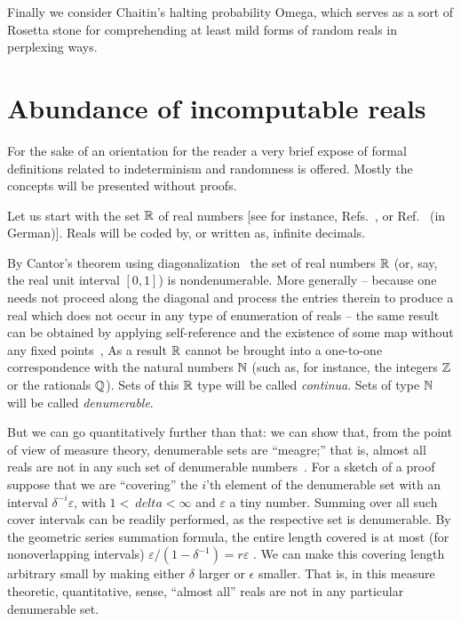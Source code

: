 Finally we consider Chaitin's halting probability Omega,
which serves as a sort of Rosetta stone for comprehending at least mild forms of random reals in perplexing ways.

\section{Abundance of incomputable reals}

For the sake of an orientation for the reader a very brief expose of formal definitions related to indeterminism and randomness is offered.
Mostly the concepts will be presented without proofs.

Let us start with the set ${\Bbb R}$ of real numbers [see for instance, Refs.~\cite{drobot,Stillwell-2013,ehrlich-1994}, or Ref.~\cite{Hlawka-zz} (in German)].
Reals will be coded by, or written as, infinite decimals.


By Cantor's theorem using diagonalization~\cite[Section~3.5.1, p.~70-71]{Stillwell-2013}
the set of real numbers ${\Bbb R}$  (or, say, the real unit interval $[0,1]$) is nondenumerable.
More generally
--
because one needs not proceed along the diagonal and process the entries therein to produce a
real which does not occur in any type of enumeration of reals
--
the same result can be obtained by applying
self-reference and the existence of some map without any fixed points~\cite[p.~368]{Yanofsky-BSL:9051621},
As a result ${\Bbb R}$  cannot be brought into a one-to-one correspondence with the natural numbers ${\Bbb N}$  (such as, for instance,
the integers ${\Bbb Z}$  or the rationals ${\Bbb Q}$).
Sets of this ${\Bbb R}$ type will be called {\em continua}.
Sets of type ${\Bbb N}$ will be called {\em denumerable}.



But we can go quantitatively further than that: we can show that, from the point of view of
measure theory, denumerable sets are ``meagre;'' that is, almost all reals are not in any such set of denumerable numbers~\cite[Section~3.5.2, p.~71-72]{Stillwell-2013}.
For a sketch of a proof suppose  that we are ``covering'' the $i$'th element of the denumerable set with an interval $\delta^{-i}\varepsilon$, with $1 <\ delta <\infty$
and $\varepsilon$ a tiny number.
Summing over all such cover intervals can be readily performed, as the respective set is denumerable. By the geometric series summation formula, the entire
length covered is at most (for nonoverlapping intervals) $\varepsilon /(1-\delta^{-1})= r\varepsilon$ . We can make this covering length arbitrary small by making
either $\delta$ larger or $\epsilon$ smaller.
That is, in this measure theoretic, quantitative, sense, ``almost all'' reals are not in any particular denumerable set.

